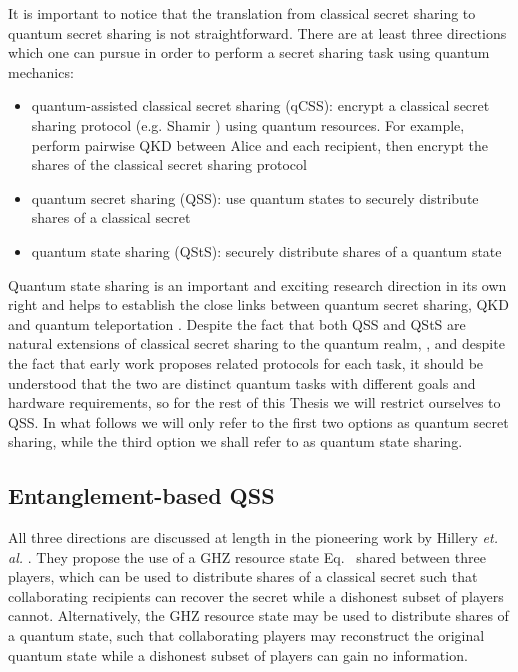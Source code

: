 It is important to notice that the translation from classical secret sharing to quantum secret sharing is not straightforward. There are at least three directions which one can pursue in order to perform a secret sharing task using quantum mechanics:

\begin{itemize}
\item quantum-assisted classical secret sharing (qCSS): encrypt a classical secret sharing protocol (e.g. Shamir ) using quantum resources. For example, perform pairwise QKD between Alice and each recipient, then encrypt the shares of the classical secret sharing protocol
\item quantum secret sharing (QSS): use quantum states to securely distribute shares of a classical secret
\item quantum state sharing (QStS): securely distribute shares of a quantum state
\end{itemize}

Quantum state sharing is an important and exciting research direction in its own right and helps to establish the close links between quantum secret sharing, QKD and quantum teleportation . Despite the fact that both QSS and QStS are natural extensions of classical secret sharing to the quantum realm, , and despite the fact that early work  proposes related protocols for each task, it should be understood that the two are distinct quantum tasks with different goals and hardware requirements, so for the rest of this Thesis we will restrict ourselves to QSS. In what follows we will only refer to the first two options as quantum secret sharing, while the third option we shall refer to as quantum state sharing.

\subsection{Entanglement-based QSS}


All three directions are discussed at length in the pioneering work by Hillery \emph{et. al.} \cite{Hillery1999}. They propose the use of a GHZ resource state Eq.~ shared between three players, which can be used to distribute shares of a classical secret such that collaborating recipients can recover the secret while a dishonest subset of players cannot. Alternatively, the GHZ resource state may be used to distribute shares of a quantum state, such that collaborating players may reconstruct the original quantum state while a dishonest subset of players can gain no information.

